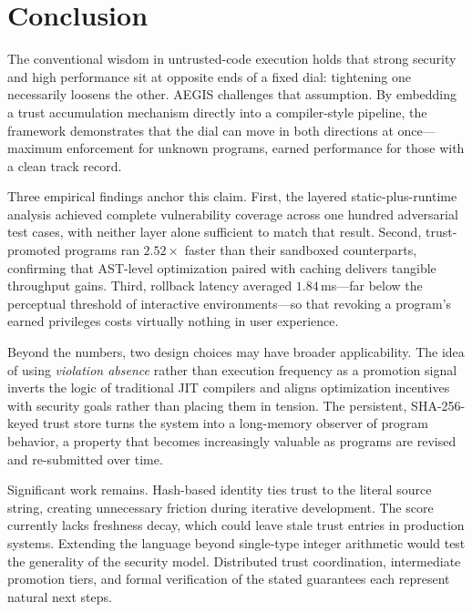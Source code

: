 \documentclass[conference]{IEEEtran}
\begin{document}
\section{Conclusion}
\label{sec:conc}

The conventional wisdom in untrusted-code execution holds that
strong security and high performance sit at opposite ends of a
fixed dial: tightening one necessarily loosens the other. AEGIS
challenges that assumption. By embedding a trust accumulation
mechanism directly into a compiler-style pipeline, the framework
demonstrates that the dial can move in both directions at
once---maximum enforcement for unknown programs, earned
performance for those with a clean track record.

Three empirical findings anchor this claim. First, the layered
static-plus-runtime analysis achieved complete vulnerability
coverage across one hundred adversarial test cases, with neither
layer alone sufficient to match that result. Second,
trust-promoted programs ran $2.52\times$ faster than their
sandboxed counterparts, confirming that AST-level optimization
paired with caching delivers tangible throughput gains. Third,
rollback latency averaged $1.84\,$ms---far below the perceptual
threshold of interactive environments---so that revoking a
program's earned privileges costs virtually nothing in user
experience.

Beyond the numbers, two design choices may have broader
applicability. The idea of using \emph{violation absence} rather
than execution frequency as a promotion signal inverts the logic
of traditional JIT compilers and aligns optimization incentives
with security goals rather than placing them in tension.
The persistent, SHA-256-keyed trust store turns the system into
a long-memory observer of program behavior, a property that
becomes increasingly valuable as programs are revised and
re-submitted over time.

Significant work remains. Hash-based identity ties trust to the
literal source string, creating unnecessary friction during
iterative development. The score currently lacks freshness
decay, which could leave stale trust entries in production
systems. Extending the language beyond single-type integer
arithmetic would test the generality of the security model.
Distributed trust coordination, intermediate promotion tiers,
and formal verification of the stated guarantees each represent
natural next steps.
\end{document}
